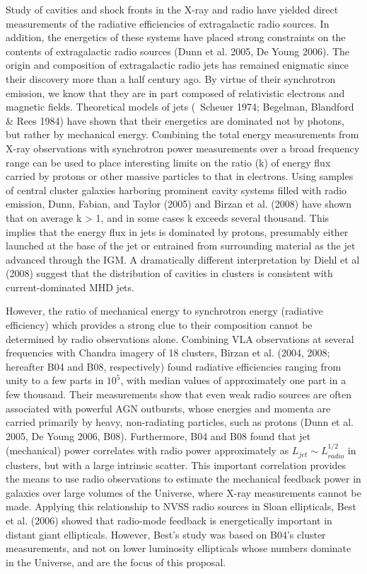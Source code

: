 \documentclass[letterpaper,11pt]{article}
\begin{document}
Study of cavities and shock fronts in the X-ray and radio have yielded
direct measurements of the radiative efficiencies of extragalactic
radio sources. In addition, the energetics of these systems have
placed strong constraints on the contents of extragalactic radio
sources (Dunn et al. 2005, De Young 2006). The origin and composition
of extragalactic radio jets has remained enigmatic since their
discovery more than a half century ago. By virtue of their synchrotron
emission, we know that they are in part composed of relativistic
electrons and magnetic fields. Theoretical models of jets (\eg\
Scheuer 1974; Begelman, Blandford \& Rees 1984) have shown that their
energetics are dominated not by photons, but rather by mechanical
energy. Combining the total energy measurements from X-ray
observations with synchrotron power measurements over a broad
frequency range can be used to place interesting limits on the ratio
(k) of energy flux carried by protons or other massive particles to
that in electrons.  Using samples of central cluster galaxies
harboring prominent cavity systems filled with radio emission, Dunn,
Fabian, and Taylor (2005) and Birzan et al. (2008) have shown that on
average k > 1, and in some cases k exceeds several thousand. This
implies that the energy flux in jets is dominated by protons,
presumably either launched at the base of the jet or entrained from
surrounding material as the jet advanced through the IGM. A
dramatically different interpretation by Diehl et al (2008) suggest
that the distribution of cavities in clusters is consistent with
current-dominated MHD jets.

However, the ratio of mechanical energy to synchrotron energy
(radiative efficiency) which provides a strong clue to their
composition cannot be determined by radio observations
alone. Combining VLA observations at several frequencies with Chandra
imagery of 18 clusters, Birzan et al. (2004, 2008; hereafter B04 and
B08, respectively) found radiative efficiencies ranging from unity to
a few parts in $10^5$, with median values of approximately one part in
a few thousand. Their measurements show that even weak radio sources
are often associated with powerful AGN outbursts, whose energies and
momenta are carried primarily by heavy, non-radiating particles, such
as protons (Dunn et al. 2005, De Young 2006, B08). Furthermore, B04
and B08 found that jet (mechanical) power correlates with radio power
approximately as $L_{jet} \sim L_{radio}^{1/2}$ in clusters, but with
a large intrinsic scatter. This important correlation provides the
means to use radio observations to estimate the mechanical feedback
power in galaxies over large volumes of the Universe, where X-ray
measurements cannot be made. Applying this relationship to NVSS radio
sources in Sloan ellipticals, Best et al. (2006) showed that
radio-mode feedback is energetically important in distant giant
ellipticals. However, Best's study was based on B04's cluster
measurements, and not on lower luminosity ellipticals whose numbers
dominate in the Universe, and are the focus of this proposal.
\end{document}
